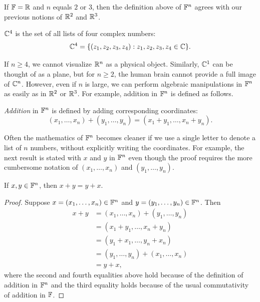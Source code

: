 If $\mathbb{F}=\mathbb{R}$ and $n$ equals $2$ or $3$, then the definition above of $\F^n$
agrees with our previous notions of $\mathbb{R}^2$ and $\mathbb{R}^3$.

\begin{example}[$\C^4$]\label{ax:1.12}
$\C^4$ is the set of all lists of four complex numbers:
\[ \mathbb{C}^4 = \{(z_1,z_2,z_3,z_4) : z_1,z_2,z_3,z_4\in\mathbb{C}\}. \]
\end{example}

%
If $n\ge4$, we cannot visualize $\mathbb{R}^n$ as a physical object. Similarly, $\mathbb{C}^1$
can be thought of as a plane, but for $n\ge2$, the human brain cannot provide a
full image of $\mathbb{C}^n$. However, even if $n$ is large, we can perform algebraic
manipulations in $\F^n$ as easily as in $\mathbb{R}^2$ or $\mathbb{R}^3$. For example, addition
in $\F^n$ is defined as follows.

\begin{definition}[Addition in $\F^n$]\label{ax:1.13}
\emph{Addition} in $\F^n$ is defined by adding corresponding coordinates:
\[ (x_1,\dots,x_n)+(y_1,\dots,y_n) = (x_1+y_1,\dots,x_n+y_n). \]
\end{definition}

Often the mathematics of $\F^n$ becomes cleaner if we use a single letter to
denote a list of $n$ numbers, without explicitly writing the coordinates. For
example, the next result is stated with $x$ and $y$ in $\F^n$ even though the
proof requires the more cumbersome notation of $(x_1,\dots,x_n)$ and
$(y_1,\dots,y_n)$.

\begin{result}\label{ax:1.14}
If $x,y\in\mathbb{F}^n$, then $x+y=y+x$.
\end{result}

\begin{proof}
Suppose $x=(x_1,\dots,x_n)\in\mathbb{F}^n$ and $y=(y_1,\dots,y_n)\in\mathbb{F}^n$. Then
\begin{align*}
x+y &= (x_1,\dots,x_n)+(y_1,\dots,y_n)\\
    &= (x_1+y_1,\dots,x_n+y_n)\\
    &= (y_1+x_1,\dots,y_n+x_n)\\
    &= (y_1,\dots,y_n)+(x_1,\dots,x_n)\\
    &= y+x,
\end{align*}
where the second and fourth equalities above hold because of the definition of
addition in $\F^n$ and the third equality holds because of the usual
commutativity of addition in $\mathbb{F}$.
\end{proof}


